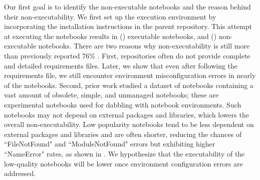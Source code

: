     Our first goal is to identify the non-executable notebooks and the reason behind their non-executability. %
    We first set up the execution environment by incorporating the installation instructions in the parent repository. This attempt at executing the notebooks results in \totalExecutable (\percentExecutable) executable notebooks, and \totalNonExecutable (\percentNonExecutable) non-executable notebooks. %
    There are two reasons why non-executability is still more than previously reported 76\% \cite{Pimentel2019}. First, repositories often do not provide complete and detailed requirements files. 
    Later, we show that even after following the requirements file, we still encounter environment misconfiguration errors in nearly \percentModuleNotFoundInTotal of the notebooks.
    Second, prior work studied a dataset of notebooks containing a vast amount of obsolete, simple, and unmanaged notebooks; these are experimental notebooks used for dabbling with notebook environments. Such notebooks may not depend on external packages and libraries, which lowers the overall non-executability. Low popularity notebooks tend to be less dependent on external packages and libraries and are often shorter, reducing the chances of ``FileNotFound" and ``ModuleNotFound" errors but exhibiting higher ``NameError" rates, as shown in \cite{Pimentel2019}. We hypothesize that the executability of the low-quality notebooks will be lower once environment configuration errors are addressed. %

